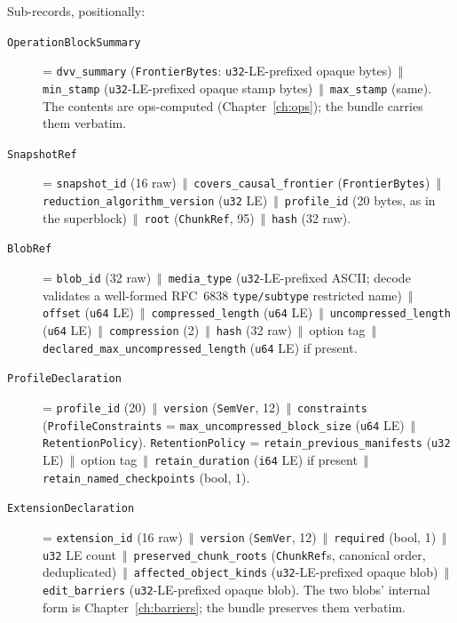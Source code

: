 \documentclass[11pt,letterpaper]{report}
\newcommand{\cat}{\ensuremath{\,\Vert\,}}
\begin{document}
Sub-records, positionally:

\begin{description}
  \item[\texttt{OperationBlockSummary}] = \texttt{dvv\_summary}
    (\texttt{FrontierBytes}: \texttt{u32}-LE-prefixed opaque bytes) \cat{}
    \texttt{min\_stamp} (\texttt{u32}-LE-prefixed opaque stamp bytes) \cat{}
    \texttt{max\_stamp} (same). The contents are ops-computed
    (Chapter~\ref{ch:ops}); the bundle carries them verbatim.
  \item[\texttt{SnapshotRef}] = \texttt{snapshot\_id} (16 raw) \cat{}
    \texttt{covers\_causal\_frontier} (\texttt{FrontierBytes}) \cat{}
    \texttt{reduction\_algorithm\_version} (\texttt{u32} LE) \cat{}
    \texttt{profile\_id} (20 bytes, as in the superblock) \cat{}
    \texttt{root} (\texttt{ChunkRef}, 95) \cat{} \texttt{hash} (32 raw).
  \item[\texttt{BlobRef}] = \texttt{blob\_id} (32 raw) \cat{}
    \texttt{media\_type} (\texttt{u32}-LE-prefixed ASCII; decode validates a
    well-formed RFC~6838 \texttt{type/subtype} restricted name) \cat{}
    \texttt{offset} (\texttt{u64} LE) \cat{} \texttt{compressed\_length}
    (\texttt{u64} LE) \cat{} \texttt{uncompressed\_length} (\texttt{u64} LE)
    \cat{} \texttt{compression} (2) \cat{} \texttt{hash} (32 raw) \cat{}
    option tag \cat{} \texttt{declared\_max\_uncompressed\_length}
    (\texttt{u64} LE) if present.
  \item[\texttt{ProfileDeclaration}] = \texttt{profile\_id} (20) \cat{}
    \texttt{version} (\texttt{SemVer}, 12) \cat{} \texttt{constraints}
    (\texttt{ProfileConstraints} =
    \texttt{max\_uncompressed\_block\_size} (\texttt{u64} LE) \cat{}
    \texttt{RetentionPolicy}). \texttt{RetentionPolicy} =
    \texttt{retain\_previous\_manifests} (\texttt{u32} LE) \cat{} option tag
    \cat{} \texttt{retain\_duration} (\texttt{i64} LE) if present \cat{}
    \texttt{retain\_named\_checkpoints} (bool, 1).
  \item[\texttt{ExtensionDeclaration}] = \texttt{extension\_id} (16 raw)
    \cat{} \texttt{version} (\texttt{SemVer}, 12) \cat{} \texttt{required}
    (bool, 1) \cat{} \texttt{u32} LE count \cat{}
    \texttt{preserved\_chunk\_roots} (\texttt{ChunkRef}s, canonical order,
    deduplicated) \cat{} \texttt{affected\_object\_kinds}
    (\texttt{u32}-LE-prefixed opaque blob) \cat{} \texttt{edit\_barriers}
    (\texttt{u32}-LE-prefixed opaque blob). The two blobs' internal form is
    Chapter~\ref{ch:barriers}; the bundle preserves them verbatim.
\end{description}
\end{document}

